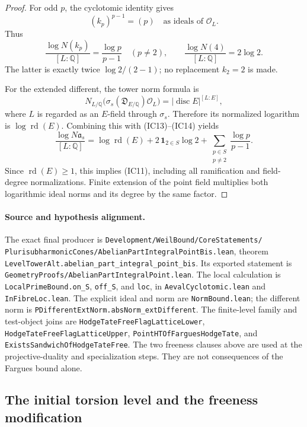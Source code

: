 \begin{proof}
For odd \(p\), the cyclotomic identity gives
\[
                 (k_p)^{p-1}=(p)
                    \quad\text{as ideals of }\mathcal O_L .
\]
Thus
\[
 \frac{\log N(k_p)}{[L:\mathbb Q]}
               =\frac{\log p}{p-1}\quad(p\ne2),\qquad
 \frac{\log N(4)}{[L:\mathbb Q]}=2\log2 .
 \tag{IC14}
\]
The latter is exactly twice
\(\log2/(2-1)\); no replacement \(k_2=2\) is made.

For the extended different, the tower norm formula is
\[
 N_{L/\mathbb Q}
  \bigl(\sigma_s(\mathfrak D_{E/\mathbb Q})\mathcal O_L\bigr)
          =|\operatorname{disc}E|^{[L:E]},
\]
where \(L\) is regarded as an \(E\)-field through
\(\sigma_s\). Therefore its normalized logarithm is
\(\log\operatorname{rd}(E)\).
Combining this with (IC13)--(IC14) yields
\[
 \frac{\log N\mathfrak a_s}{[L:\mathbb Q]}
       =\log\operatorname{rd}(E)
          +2\,\mathbf1_{2\in S}\log2
          +\sum_{\substack{p\in S\\p\ne2}}
                                    \frac{\log p}{p-1}.
 \tag{IC15}
\]
Since \(\operatorname{rd}(E)\ge1\), this implies
(IC11), including all ramification and field-degree
normalizations. Finite extension of the point field
multiplies both logarithmic ideal norms and its
degree by the same factor.
\end{proof}

\paragraph{Source and hypothesis alignment.}
The exact final producer is
\texttt{Development/WeilBound/CoreStatements/%
PlurisubharmonicCones/AbelianPartIntegralPointBis.lean},
theorem
\texttt{LevelTowerAlt.abelian\_part\_integral\_point\_bis}.
Its exported statement is
\texttt{GeometryProofs/AbelianPartIntegralPoint.lean}.
The local calculation is
\texttt{LocalPrimeBound.on\_S}, \texttt{off\_S},
and \texttt{loc}, in
\texttt{AevalCyclotomic.lean} and \texttt{InFibreLoc.lean}.
The explicit ideal and norm are \texttt{NormBound.lean};
the different norm is
\texttt{PDifferentExtNorm.absNorm\_extDifferent}.
The finite-level family and test-object joins are
\texttt{HodgeTateFreeFlagLatticeLower},
\texttt{HodgeTateFreeFlagLatticeUpper},
\texttt{PointHTOfFarguesHodgeTate}, and
\texttt{ExistsSandwichOfHodgeTateFree}.
The two freeness clauses above are used at the
projective-duality and specialization steps.
They are not consequences of the Fargues bound alone.

\subsection{The initial torsion level and the freeness modification}
\label{subsec:sr-initial-htfree-construction}

